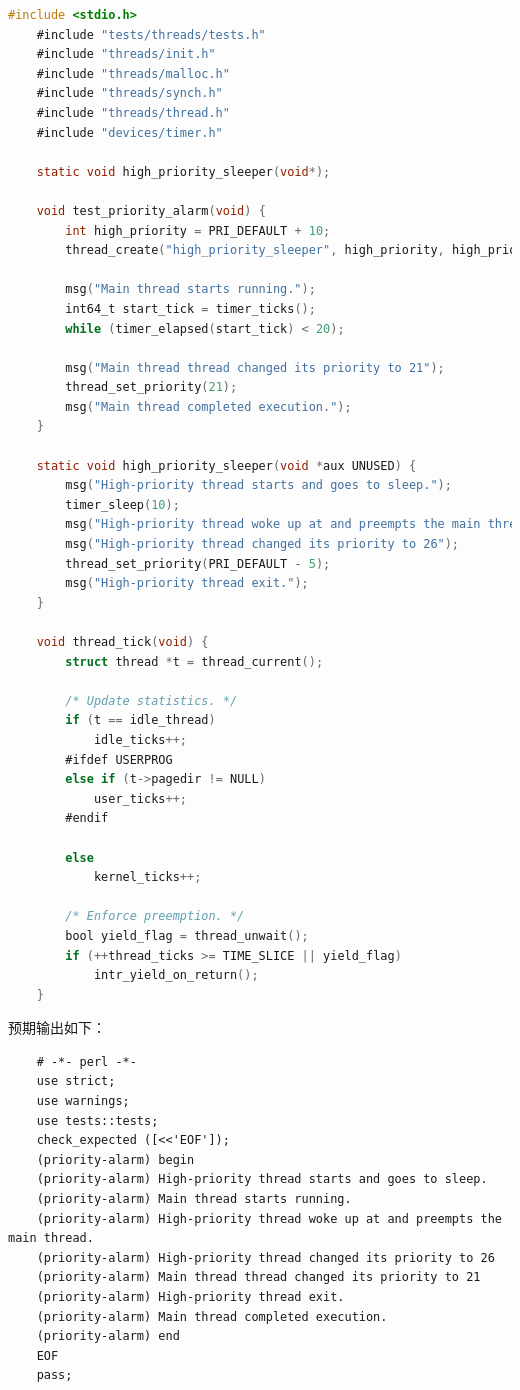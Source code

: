 \documentclass{article}
\begin{document}
\begin{lstlisting}[language=C, title=测试脚本]
	#include <stdio.h>
	#include "tests/threads/tests.h"
	#include "threads/init.h"
	#include "threads/malloc.h"
	#include "threads/synch.h"
	#include "threads/thread.h"
	#include "devices/timer.h"
	
	static void high_priority_sleeper(void*);
	
	void test_priority_alarm(void) {
		int high_priority = PRI_DEFAULT + 10;
		thread_create("high_priority_sleeper", high_priority, high_priority_sleeper, NULL);
		
		msg("Main thread starts running.");
		int64_t start_tick = timer_ticks();
		while (timer_elapsed(start_tick) < 20);
		
		msg("Main thread thread changed its priority to 21");
		thread_set_priority(21);
		msg("Main thread completed execution.");
	}
	
	static void high_priority_sleeper(void *aux UNUSED) {
		msg("High-priority thread starts and goes to sleep.");
		timer_sleep(10);
		msg("High-priority thread woke up at and preempts the main thread.");
		msg("High-priority thread changed its priority to 26");
		thread_set_priority(PRI_DEFAULT - 5);
		msg("High-priority thread exit.");
	}
	
	void thread_tick(void) {
		struct thread *t = thread_current();
		
		/* Update statistics. */
		if (t == idle_thread)
			idle_ticks++;
		#ifdef USERPROG
		else if (t->pagedir != NULL)
			user_ticks++;
		#endif
		
		else
			kernel_ticks++;
		
		/* Enforce preemption. */
		bool yield_flag = thread_unwait();
		if (++thread_ticks >= TIME_SLICE || yield_flag)
			intr_yield_on_return();
	}
\end{lstlisting}

预期输出如下：

\begin{lstlisting}
	# -*- perl -*-
	use strict;
	use warnings;
	use tests::tests;
	check_expected ([<<'EOF']);
	(priority-alarm) begin
	(priority-alarm) High-priority thread starts and goes to sleep.
	(priority-alarm) Main thread starts running.
	(priority-alarm) High-priority thread woke up at and preempts the main thread.
	(priority-alarm) High-priority thread changed its priority to 26
	(priority-alarm) Main thread thread changed its priority to 21
	(priority-alarm) High-priority thread exit.
	(priority-alarm) Main thread completed execution.
	(priority-alarm) end
	EOF
	pass;
\end{lstlisting}
\end{document}
